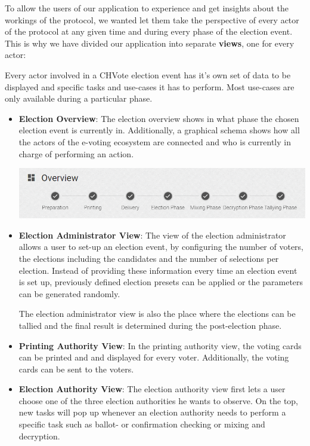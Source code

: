 To allow the users of our application to experience and get insights about the workings of the protocol, we wanted let them take the perspective of every actor of the protocol at any given time and during every phase of the election event. This is why we have divided our application into separate \textbf{views}, one for every actor:

Every actor involved in a CHVote election event has it's own set of data to be displayed and specific tasks and use-cases it has to perform. Most use-cases are only available during a particular phase.

\begin{itemize}
	\item \textbf{Election Overview}: The election overview shows in what phase the chosen election event is currently in. Additionally, a graphical schema shows how all the actors of the e-voting ecosystem are connected and who is currently in charge of performing an action.
	\begin{center}
\includegraphics[scale=0.65]{assets/screenshots/overview.PNG}
\label{Election Overview}%
\end{center}

	\item \textbf{Election Administrator View}: The view of the election administrator allows a user to set-up an election event, by configuring the number of voters, the elections including the candidates and the number of selections per election. Instead of providing these information every time an election event is set up, previously defined election presets can be applied or the parameters can be generated randomly.
	
The election administrator view is also the place where the elections can be tallied and the final result is determined during the post-election phase.
	\item \textbf{Printing Authority View}: In the printing authority view, the voting cards can be printed and and displayed for every voter. Additionally, the voting cards can be sent to the voters.
	\item \textbf{Election Authority View}: The election authority view first lets a user choose one of the three election authorities he wants to observe. On the top, new tasks will pop up whenever an election authority needs to perform a specific task such as ballot- or confirmation checking or mixing and decryption.
	

\end{itemize}
